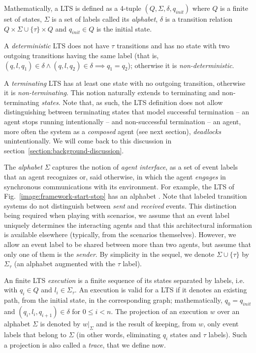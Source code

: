 Mathematically, a LTS is defined as a 4-tuple $(Q,\Sigma,\delta,q_{init})$ where $Q$ is a finite set of states, $\Sigma$ is a set of labels called its \emph{alphabet}, $\delta$ is a transition relation $Q \times \Sigma\cup\{\tau\} \times Q$ and $q_{init} \in Q$ is the initial state.

A \emph{deterministic} LTS does not have $\tau$ transitions and has no state with two outgoing transitions having the same label (that is, $(q,l,q_1) \in \delta \wedge (q,l,q_2) \in \delta \implies q_1 = q_2$); otherwise it is \emph{non-deterministic}.

A \emph{terminating} LTS has at least one state with no outgoing transition, otherwise it is \emph{non-terminating}. This notion naturally extends to terminating and non-terminating \emph{states}. Note that, as such, the LTS definition does not allow distinguishing between terminating states that model successful termination -- an agent stops running intentionally -- and non-successful termination -- an agent, more often the system as a \emph{composed} agent (see next section), \emph{deadlocks} unintentionally. We will come back to this discussion in section~\ref{section:background-discussion}.

The \emph{alphabet} $\Sigma$ captures the notion of \emph{agent interface}, as a set of event labels that an agent recognizes or, said otherwise, in which the agent \emph{engages} in synchronous communications with its environment. For example, the LTS of Fig.~\ref{image:framework-start-stop} has an alphabet . Note that labeled transition systems do not distinguish between \emph{sent} and \emph{received} events. This distinction being required when playing with scenarios, we assume that an event label uniquely determines the interacting agents and that this architectural information is available elsewhere (typically, from the scenarios themselves). However, we allow an event label to be shared between more than two agents, but assume that only one of them is the \emph{sender}. By simplicity in the sequel, we denote $\Sigma\cup\{\tau\}$ by $\Sigma_{\tau}$ (an alphabet augmented with the $\tau$ label).

An finite LTS \emph{execution} is a finite sequence of its states separated by labels, i.e.  with $q_i \in Q$ and $l_i \in \Sigma_{\tau}$. An execution is valid for a LTS if it denotes an existing path, from the initial state, in the corresponding graph; mathematically, $q_0 = q_{init}$ and $(q_i,l_i,q_{i+1}) \in \delta$ for $0 \leq i < n$. The projection of an execution $w$ over an alphabet $\Sigma$ is denoted by $w|_{\Sigma}$ and is the result of keeping, from $w$, only event labels that belong to $\Sigma$ (in other words, eliminating $q_i$ states and $\tau$ labels). Such a projection is also called a \emph{trace}, that we define now.

